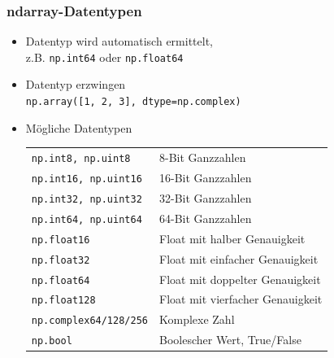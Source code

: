 \subsubsection{ndarray-Datentypen}
\begin{itemize}
	\item Datentyp wird automatisch ermittelt,\\
	z.B. \texttt{np.int64} oder \texttt{np.float64}
	\item Datentyp erzwingen\\
	\texttt{np.array([1, 2, 3], dtype=np.complex)}
	\item Mögliche Datentypen\\
	\begin{tabular}{|l|l|}
		\hline 
		\texttt{np.int8, np.uint8} &8-Bit Ganzzahlen\\ 
		\texttt{np.int16, np.uint16} &16-Bit Ganzzahlen\\ 
		\texttt{np.int32, np.uint32} &32-Bit Ganzzahlen\\ 
		\texttt{np.int64, np.uint64} &64-Bit Ganzzahlen\\ 
		\texttt{np.float16} &Float mit halber Genauigkeit\\ 
		\texttt{np.float32} &Float mit einfacher Genauigkeit\\ 
		\texttt{np.float64} &Float mit doppelter Genauigkeit\\ 
		\texttt{np.float128} &Float mit vierfacher Genauigkeit\\  
		\texttt{np.complex64/128/256} &Komplexe Zahl\\ 
		\texttt{np.bool} &Boolescher Wert, True/False\\ 
		\hline 
	\end{tabular} 
\end{itemize}

